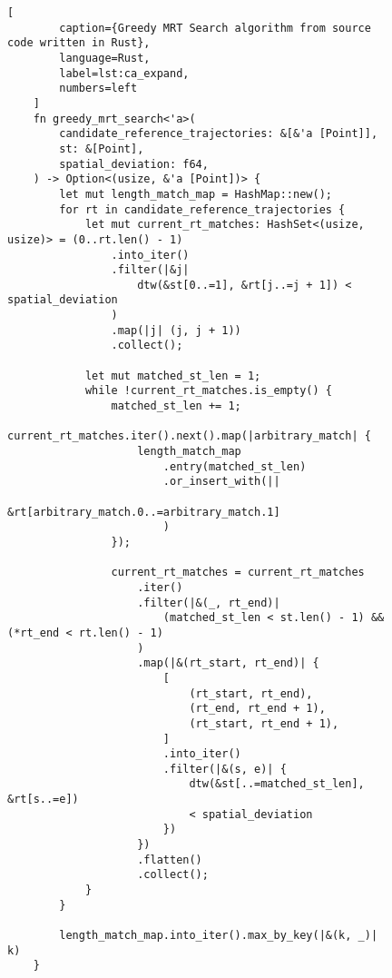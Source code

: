 \begin{figure}
    \begin{lstlisting}[
        caption={Greedy MRT Search algorithm from source code written in Rust},
        language=Rust,
        label=lst:ca_expand,
        numbers=left
    ]
    fn greedy_mrt_search<'a>(
        candidate_reference_trajectories: &[&'a [Point]],
        st: &[Point],
        spatial_deviation: f64,
    ) -> Option<(usize, &'a [Point])> {
        let mut length_match_map = HashMap::new();
        for rt in candidate_reference_trajectories {
            let mut current_rt_matches: HashSet<(usize, usize)> = (0..rt.len() - 1)
                .into_iter()
                .filter(|&j|
                    dtw(&st[0..=1], &rt[j..=j + 1]) < spatial_deviation
                )
                .map(|j| (j, j + 1))
                .collect();
    
            let mut matched_st_len = 1;
            while !current_rt_matches.is_empty() {
                matched_st_len += 1;
                current_rt_matches.iter().next().map(|arbitrary_match| {
                    length_match_map
                        .entry(matched_st_len)
                        .or_insert_with(||
                            &rt[arbitrary_match.0..=arbitrary_match.1]
                        )
                });
                
                current_rt_matches = current_rt_matches
                    .iter()
                    .filter(|&(_, rt_end)|
                        (matched_st_len < st.len() - 1) && (*rt_end < rt.len() - 1)
                    )
                    .map(|&(rt_start, rt_end)| {
                        [
                            (rt_start, rt_end),
                            (rt_end, rt_end + 1),
                            (rt_start, rt_end + 1),
                        ]
                        .into_iter()
                        .filter(|&(s, e)| {
                            dtw(&st[..=matched_st_len], &rt[s..=e]) 
                            < spatial_deviation
                        })
                    })
                    .flatten()
                    .collect();
            }
        }
    
        length_match_map.into_iter().max_by_key(|&(k, _)| k)
    }
    \end{lstlisting}
\end{figure}